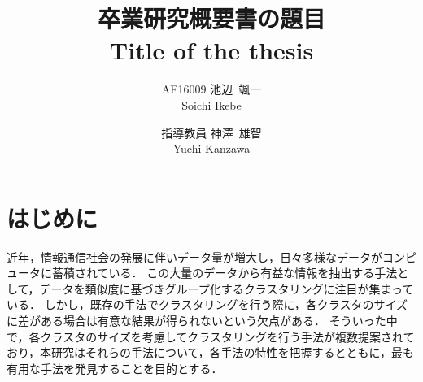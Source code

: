 \documentclass[twocolumn, a4paper]{icethesisabst}
\title{{\bf 卒業研究概要書の題目}
  {\normalsize \\ Title of the thesis}}
\author{
    AF16009 池辺~颯一 \\ Soichi Ikebe \and
    指導教員 神澤~雄智 \\ Yuchi Kanzawa
  }
\begin{document}
\maketitle
\section{はじめに}

近年，情報通信社会の発展に伴いデータ量が増大し，日々多様なデータがコンピュータに蓄積されている．
この大量のデータから有益な情報を抽出する手法として，データを類似度に基づきグループ化するクラスタリングに注目が集まっている．
しかし，既存の手法でクラスタリングを行う際に，各クラスタのサイズに差がある場合は有意な結果が得られないという欠点がある．
そういった中で，各クラスタのサイズを考慮してクラスタリングを行う手法が複数提案されており，本研究はそれらの手法について，各手法の特性を把握するとともに，最も有用な手法を発見することを目的とする．
\end{document}
